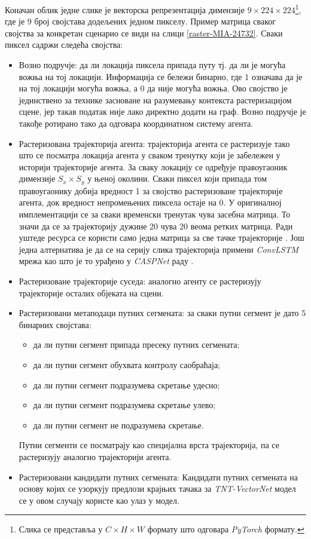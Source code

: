 \documentclass[11pt,oneside]{memoir}
\begin{document}
Коначан облик једне слике је векторска репрезентација димензије 
$9\times 224\times 224$\footnote{Слика се представља у $C\times H\times W$ формату што одговара \textit{PyTorch} формату.}, 
где је $9$ број својстава додељених једном пикселу. Пример матрица сваког својства за конкретан сценарио се види на слици \ref{raster-MIA-24732}. 
Сваки пиксел садржи следећа својства:
\begin{itemize}
  \item Возно подручје: да ли локација пиксела припада путу тј. да ли је могућа вожња на тој локацији. Информација се бележи бинарно, где
        1 означава да је на тој локацији могућа вожња, а 0 да није могућа вожња. Ово својство је јединствено за технике
        засноване на разумевању контекста растеризацијом сцене, јер такав податак није лако директно додати на граф. 
        Возно подручје је такође ротирано тако да одговара координатном систему агента.
  \item Растеризована трајекторија агента: трајекторија агента се растеризује тако што се посматра локација агента
        у сваком тренутку који је забележен у историји трајекторије агента. За сваку локацију се одређује
        правоугаоник димензије $S_x\times S_y$ у њеној околини. 
        Сваки пиксел који припада том правоугаонику добија вредност 1 за својство растеризоване
        трајекторије агента, док вредност непромењених пиксела остаје на 0. 
        У оригиналној имплементацији се за сваки временски тренутак чува засебна матрица. То значи да се за трајекторију дужине 20 
        чува 20 веома ретких матрица. Ради уштеде ресурса се користи само једна матрица за све тачке трајекторије \cite{home}.
        Још једна алтернатива је да се на серију слика трајекторија примени \textit{ConvLSTM} мрежа као што је то урађено у \textit{CASPNet}
        раду \cite{caspnet}. 
  \item Растеризоване трајекторије суседа: аналогно агенту се растеризују трајекторије осталих објеката на сцени.
  \item Растеризовани метаподаци путних сегмената: за сваки путни сегмент је дато 5 бинарних својстава:
        \begin{itemize}
          \item да ли путни сегмент припада пресеку путних сегмената;
          \item да ли путни сегмент обухвата контролу саобраћаја;
          \item да ли путни сегмент подразумева скретање удесно;
          \item да ли путни сегмент подразумева скретање улево;
          \item да ли путни сегмент не подразумева скретање.
        \end{itemize}
        Путни сегменти се посматрају као специјална врста трајекторија, па се растеризују аналогно трајекторији агента.
  \item Растеризовани кандидати путних сегмената: Кандидати путних сегмената на основу којих се узоркују предлози крајњих тачака
        за \textit{TNT-VectorNet} модел се у овом случају користе као улаз у модел. 
\end{itemize}
\end{document}
